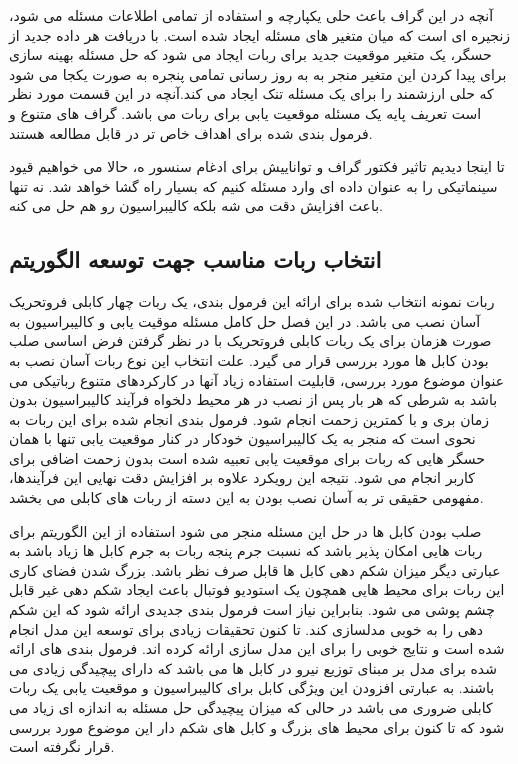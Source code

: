 آنچه در این گراف باعث حلی یکپارچه و استفاده از تمامی اطلاعات مسئله می شود، زنجیره ای است که میان متغیر های مسئله ایجاد شده است. با دریافت هر داده جدید از حسگر، یک متغیر موقعیت جدید برای ربات ایجاد می شود که حل مسئله بهینه سازی برای پیدا کردن این متغیر منجر به به روز رسانی تمامی پنجره به صورت یکجا می شود که حلی ارزشمند را برای یک مسئله تنک ایجاد می کند.آنچه در این قسمت مورد نظر است تعریف پایه یک مسئله موقعیت یابی برای ربات می باشد. گراف های متنوع و فرمول بندی شده برای اهداف خاص تر در 
\cite{yang2022indoor. song2021tightly, leitinger2017factor}
قابل مطالعه هستند. 

تا اینجا دیدیم تاثیر فکتور گراف و تواناییش برای ادغام سنسور ه، حالا می خواهیم قیود سینماتیکی را به عنوان داده ای وارد مسئله کنیم که بسیار راه گشا خواهد شد. نه تنها باعث افزایش دقت می شه بلکه کالیبراسیون رو هم حل می کنه.





\subsection{انتخاب ربات مناسب جهت توسعه  الگوریتم}
ربات نمونه انتخاب شده برای ارائه این فرمول بندی، یک ربات چهار کابلی فروتحریک آسان نصب می باشد. در این فصل حل کامل مسئله موقیت یابی و کالیبراسیون به صورت هزمان برای یک ربات کابلی فروتحریک با در نظر گرفتن فرض اساسی صلب بودن کابل ها مورد بررسی قرار می گیرد. علت انتخاب این نوع ربات آسان نصب به عنوان موضوع مورد بررسی، قابلیت استفاده زیاد آنها در کارکردهای متنوع رباتیکی می باشد به شرطی که هر بار پس از نصب در هر محیط دلخواه فرآیند کالیبراسیون بدون زمان بری و با کمترین زحمت انجام شود. فرمول بندی انجام شده برای این ربات به نحوی است که منجر به یک کالیبراسیون خودکار در کنار موقعیت یابی تنها با همان حسگر هایی که ربات برای موقعیت یابی تعبیه شده است بدون زحمت اضافی برای کاربر انجام می شود. نتیجه این رویکرد علاوه بر افزایش دقت نهایی این فرآیندها، مفهومی حقیقی تر به آسان نصب بودن به این دسته از ربات های کابلی می بخشد. 

صلب بودن کابل ها در حل این مسئله منجر می شود استفاده از این الگوریتم برای ربات هایی امکان پذیر باشد که نسبت جرم پنجه ربات به جرم کابل ها زیاد باشد به عبارتی دیگر میزان شکم دهی کابل ها قابل صرف نظر باشد. بزرگ شدن فضای کاری این ربات برای محیط هایی همچون یک استودیو فوتبال باعث ایجاد شکم دهی غیر قابل چشم پوشی می شود. بنابراین نیاز است فرمول بندی جدیدی ارائه شود که این شکم دهی را به خوبی مدلسازی کند. تا کنون تحقیقات زیادی برای توسعه این مدل انجام شده است و نتایج خوبی را برای این مدل سازی ارائه کرده اند. فرمول بندی های ارائه شده برای مدل بر مبنای توزیع نیرو در کابل ها می باشد که دارای پیچیدگی زیادی می باشند. به عبارتی افزودن این ویژگی کابل برای کالیبراسیون و موقعیت یابی یک ربات کابلی ضروری می باشد در حالی که میزان پیچیدگی حل مسئله به اندازه ای زیاد می شود که تا کنون برای محیط های بزرگ و کابل های شکم دار این موضوع مورد بررسی قرار نگرفته است. 

